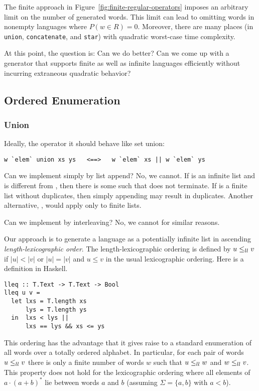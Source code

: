 The finite approach in Figure~\ref{fig:finite-regular-operators}
imposes an arbitrary limit on the number of generated words. This
limit can lead to omitting words in nonempty languages where $P (w\in
R) = 0$. Moreover, there are many places (in \texttt{union},
\texttt{concatenate}, and \texttt{star}) with quadratic worst-case
time complexity. 

At this point, the question is: Can we do better? Can we come up with
a generator that supports finite as well as infinite languages
efficiently without incurring extraneous quadratic behavior?


\subsection{Ordered Enumeration}
\label{sec:ordered-enumeration}


\subsubsection{Union}
Ideally, the  operator it should behave like
set union:
\begin{lstlisting}
w `elem` union xs ys   <==>   w `elem` xs || w `elem` ys
\end{lstlisting}
Can we implement  simply by list append?
No, we cannot. 
If  is an infinite list and  is different from
, then there is some  such that
 does not terminate.
If  is a finite list without duplicates, then simply
appending  may result in duplicates.
Another alternative, , would apply only to finite lists.

Can we implement  by interleaving? No, we cannot for
similar reasons.

Our approach is to generate a language as a potentially infinite list
in ascending \emph{length-lexicographic order}. The
length-lexicographic ordering is defined by $u \le_{ll} 
v$ if $|u|<|v|$ or $|u|=|v|$ and $u\le v$ in the usual lexicographic
ordering. Here is a definition in Haskell.
\begin{lstlisting}
lleq :: T.Text -> T.Text -> Bool
lleq u v =
  let lxs = T.length xs
      lys = T.length ys
  in  lxs < lys ||
      lxs == lys && xs <= ys
\end{lstlisting}
This ordering has the advantage that it gives raise to a standard
enumeration of all words over a totally ordered alphabet. In
particular, for each pair of words $u \le_{ll} v$ there is only a finite
number of words $w$ such that $u \le_{ll} w$ and $w \le_{ll} v$. This property does
not hold for the lexicographic ordering where all elements of $a\cdot
(a+b)^*$ lie between words $a$ and $b$ (assuming $\Sigma = \{a, b\}$
with $a<b$).

